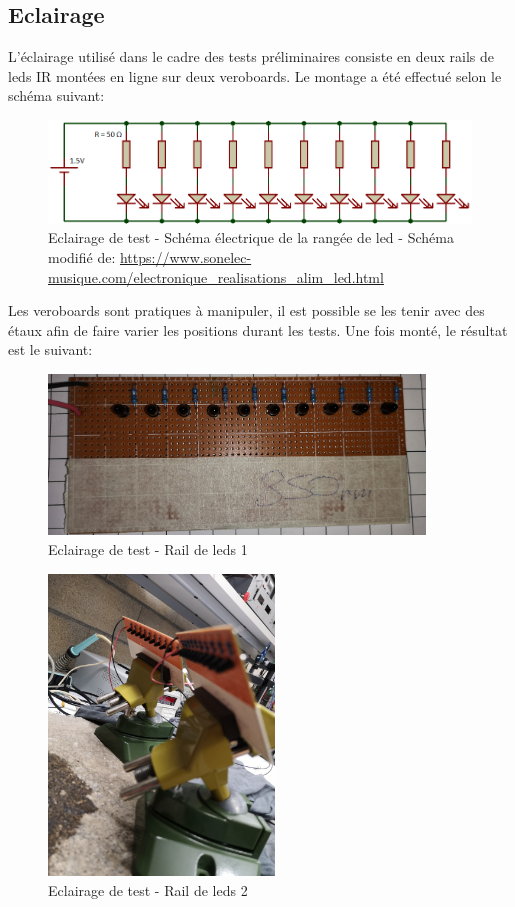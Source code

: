 \subsection{Eclairage}
L'éclairage utilisé dans le cadre des tests préliminaires consiste en deux rails de leds IR montées en ligne sur deux veroboards.
Le montage a été effectué selon le schéma suivant:
\begin{figure}[H]
    \centering
    \includegraphics[width=13cm]{assets/figures/schema_leds1.png}
    \caption{Eclairage de test - Schéma électrique de la rangée de led - Schéma modifié de: \url{https://www.sonelec-musique.com/electronique_realisations_alim_led.html}}
\end{figure}
Les veroboards sont pratiques à manipuler, il est possible se les tenir avec des étaux afin de faire varier les positions durant les tests. Une fois monté,
le résultat est le suivant:
\begin{figure}[H]
    \centering
    \includegraphics[width=10cm]{assets/figures/rail_led1.jpg}
    \caption{Eclairage de test - Rail de leds 1}
\end{figure}

\begin{figure}[H]
    \centering
    \includegraphics[width=6cm]{assets/figures/rail_led2.jpg}
    \caption{Eclairage de test - Rail de leds 2}
\end{figure}
